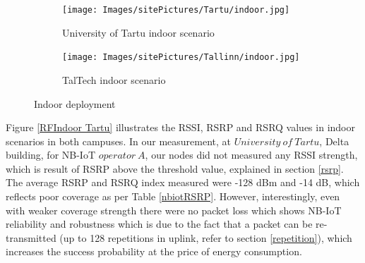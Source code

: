 \documentclass[12pt]{article}
\begin{document}
\begin{figure}[h!]
\centering
\begin{subfigure}[t]{0.42 \linewidth}
  \centering
  \texttt{[image: Images/sitePictures/Tartu/indoor.jpg]}
  \caption{University of Tartu indoor scenario}
  \end{subfigure}
  
  \begin{subfigure}[t]{0.42\linewidth}
    \centering
    \texttt{[image: Images/sitePictures/Tallinn/indoor.jpg]}
    \caption{TalTech indoor scenario}
  \end{subfigure}
   
    \caption{Indoor deployment}
    \label{fig:Indoor deployment}
\end{figure}

Figure \ref{RFIndoor Tartu} illustrates the RSSI, RSRP and RSRQ values in indoor scenarios in both campuses. In our measurement, at $University\ of\ Tartu$, Delta building, for NB-IoT $operator\ A$, our nodes did not measured any RSSI strength, which is result of RSRP above the threshold value, explained in section \ref{rsrp}. The average RSRP and RSRQ index measured were -128 dBm and -14 dB, which reflects poor coverage as per Table \ref{nbiotRSRP}. However, interestingly, even with weaker coverage strength there were no packet loss which shows NB-IoT reliability and robustness which is due to the fact that a packet can be re-transmitted (up to 128 repetitions in uplink, refer to section \ref{repetition}), which increases the success probability at the price of energy consumption.
\end{document}
